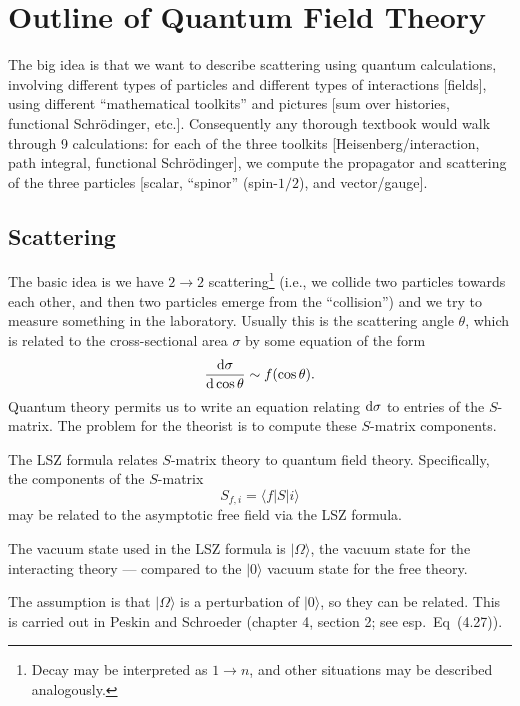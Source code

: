 \chapter{Outline of Quantum Field Theory}

\M
The big idea is that we want to describe scattering using quantum
calculations, involving different types of particles and different types
of interactions [fields], using different ``mathematical toolkits'' and
pictures [sum over histories, functional Schr\"{o}dinger, etc.].
Consequently any thorough textbook would walk through 9 calculations:
for each of the three toolkits [Heisenberg/interaction, path integral,
functional Schr\"{o}dinger], we compute the propagator and scattering
of the three particles [scalar, ``spinor'' (spin-$1/2$), and vector/gauge].


\section{Scattering}

The basic idea is we have $2\to2$ scattering\footnote{Decay may be
interpreted as $1\to n$, and other situations may be described
analogously.}  (i.e., we collide two particles towards each other, and
then two particles emerge from the ``collision'') and we try to measure
something in the laboratory. Usually this is the scattering angle
$\theta$, which is related to the cross-sectional area $\sigma$ by some
equation of the form
\begin{equation}
\frac{\mathrm{d}\sigma}{\mathrm{d}\cos\theta}\sim f(\cos\theta).
\end{equation}
Quantum theory permits us to write an equation relating $\mathrm{d}\sigma$ to
entries of the $S$-matrix. The problem for the theorist is to compute
these $S$-matrix components.

\M
The LSZ formula relates $S$-matrix theory to quantum field theory.
Specifically, the components of the $S$-matrix
\begin{equation}
S_{f,i} = \langle f|S|i\rangle
\end{equation}
may be related to the asymptotic free field via the LSZ formula.

The vacuum state used in the LSZ formula is $|\Omega\rangle$, the vacuum
state for the interacting theory --- compared to the $|0\rangle$ vacuum
state for the free theory. 

The assumption is that $|\Omega\rangle$ is a perturbation of
$|0\rangle$, so they can be related. This is carried out in Peskin and
Schroeder (chapter 4, section 2; see esp.\ Eq~(4.27)).

